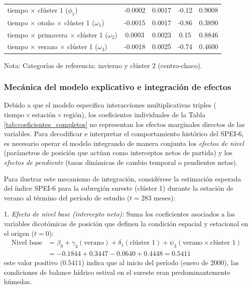 \documentclass[11pt,a4paper]{article}
\begin{document}
\begin{table}[ht!]
\begin{threeparttable}
\begin{tabular}{l c c c c}
tiempo $\times$ clúster 1 ($\phi_1$) & -0.0002 & 0.0017 & -0.12 & 0.9008 \\
tiempo $\times$ otoño $\times$ clúster 1 ($\omega_1$) & -0.0015 & 0.0017 & -0.86 & 0.3890 \\
tiempo $\times$ primavera $\times$ clúster 1 ($\omega_2$) & 0.0003 & 0.0023 & 0.15 & 0.8846 \\
tiempo $\times$ verano $\times$ clúster 1 ($\omega_3$) & -0.0018 & 0.0025 & -0.74 & 0.4600 \\
\hline\hline
\end{tabular}
\begin{tablenotes}
\item \scriptsize Nota: Categorías de referencia: invierno y clúster 2 (centro-chaco).
\end{tablenotes}
\end{threeparttable}
\end{table}

\subsubsection{Mecánica del modelo explicativo e integración de efectos}

Debido a que el modelo especifica interacciones multiplicativas triples ($\text{tiempo} \times \text{estación} \times \text{región}$), los coeficientes individuales de la Tabla \ref{tab:coeficientes_completos} no representan los efectos marginales directos de las variables. Para decodificar e interpretar el comportamiento histórico del SPEI-6, es necesario operar el modelo integrando de manera conjunta los \textit{efectos de nivel} (parámetros de posición que actúan como interceptos netos de partida) y los \textit{efectos de pendiente} (tasas dinámicas de cambio temporal o pendientes netas).

Para ilustrar este mecanismo de integración, considérese la estimación esperada del índice SPEI-6 para la subregión sureste (clúster 1) durante la estación de verano al término del período de estudio ($t = 283$ meses):

1. \textit{Efecto de nivel base (intercepto neto):} Suma los coeficientes asociados a las variables dicotómicas de posición que definen la condición espacial y estacional en el origen ($t = 0$):
\begin{equation}
\begin{split}
\text{Nivel base} &= \beta_0 + \gamma_3(\text{verano}) + \delta_1(\text{clúster 1}) + \psi_3(\text{verano} \times \text{clúster 1}) \\
&= -0.1844 + 0.3447 - 0.0640 + 0.4448 = \mathbf{0.5411}
\end{split}
\end{equation}
este valor positivo ($0.5411$) indica que al inicio del período (enero de 2000), las condiciones de balance hídrico estival en el sureste eran predominantemente húmedas.
\end{document}
